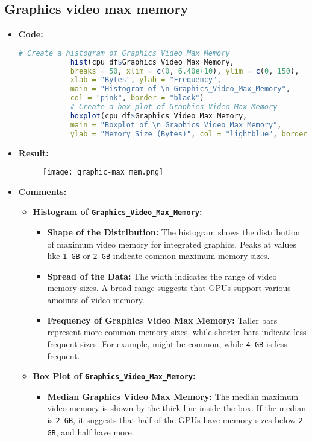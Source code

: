 \documentclass{article}
\begin{document}
	\subsection{Graphics video max memory}
	\begin{itemize}
		\item \textbf{Code:}
		\begin{lstlisting}[basicstyle=\ttfamily, frame=single,language=R]
			# Create a histogram of Graphics_Video_Max_Memory
			hist(cpu_df$Graphics_Video_Max_Memory, 
			breaks = 50, xlim = c(0, 6.40e+10), ylim = c(0, 150),
			xlab = "Bytes", ylab = "Frequency", 
			main = "Histogram of \n Graphics_Video_Max_Memory", 
			col = "pink", border = "black")
			# Create a box plot of Graphics_Video_Max_Memory
			boxplot(cpu_df$Graphics_Video_Max_Memory, 
			main = "Boxplot of \n Graphics_Video_Max_Memory", 
			ylab = "Memory Size (Bytes)", col = "lightblue", border = "black")
		\end{lstlisting}
		\item \textbf{Result:}
		\begin{figure}[h]
			\centering
			\texttt{[image: graphic-max\_mem.png]}   %
			\label{fig:enter-label}
		\end{figure}
		\item \textbf{Comments:}
		\begin{itemize}
			\item \textbf{Histogram of \texttt{Graphics\_Video\_Max\_Memory}:}
			\begin{itemize}
				\item \textbf{Shape of the Distribution:} The histogram shows the distribution of maximum video memory for integrated graphics. Peaks at values like \texttt{1 GB} or \texttt{2 GB} indicate common maximum memory sizes.
				\item \textbf{Spread of the Data:} The width indicates the range of video memory sizes. A broad range suggests that GPUs support various amounts of video memory.
				\item \textbf{Frequency of Graphics Video Max Memory:} Taller bars represent more common memory sizes, while shorter bars indicate less frequent sizes. For example,  might be common, while \texttt{4 GB} is less frequent.
			\end{itemize}
			\item \textbf{Box Plot of \texttt{Graphics\_Video\_Max\_Memory}:}
			\begin{itemize}
				\item \textbf{Median Graphics Video Max Memory:} The median maximum video memory is shown by the thick line inside the box. If the median is \texttt{2 GB}, it suggests that half of the GPUs have memory sizes below \texttt{2 GB}, and half have more.

\end{itemize}
\end{itemize}
\end{itemize}
\end{document}
